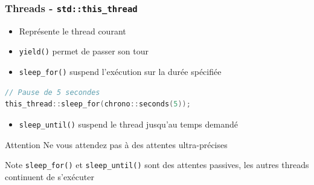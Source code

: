 \documentclass[C++.tex]{subfiles}
\begin{document}
\begin{frame}[fragile]
	\frametitle{Threads - \lstinline|std::this_thread|}
	\begin{itemize}
		\item Représente le thread courant
		\item \lstinline|yield()| permet de \og passer son tour\fg{}


		\item \lstinline|sleep_for()| suspend l'exécution sur la durée spécifiée
	\end{itemize}

	\begin{lstlisting}[language=C++]
// Pause de 5 secondes
this_thread::sleep_for(chrono::seconds(5));\end{lstlisting}

	\begin{itemize}
		\item \lstinline|sleep_until()| suspend le thread jusqu'au temps demandé
	\end{itemize}

	\begin{alertblock}{Attention}
		Ne vous attendez pas à des attentes ultra-précises

	\end{alertblock}

	\begin{block}{Note}
		\lstinline|sleep_for()| et \lstinline|sleep_until()| sont des attentes passives, les autres threads continuent de s'exécuter
	\end{block}
\end{frame}
\end{document}
